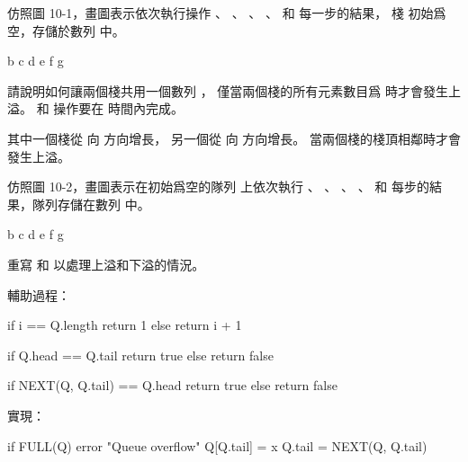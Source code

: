 \startsection[
  reference=section:stack_and_queue,
  title={Stacks and queues},
]

\startEXERCISE
仿照圖 10-1，畫圖表示依次執行操作 、 、 、
 、   和  每一步的結果，
棧  初始爲空，存儲於數列  中。
\stopEXERCISE

\startANSWER
{}
{\externalfigure[output/e10_1_1-2]}{b}
{\externalfigure[output/e10_1_1-3]}{c}
{\externalfigure[output/e10_1_1-4]}{d}
{\externalfigure[output/e10_1_1-5]}{e}
{\externalfigure[output/e10_1_1-6]}{f}
{\externalfigure[output/e10_1_1-7]}{g}
\stopcombination
\stopANSWER

\startEXERCISE
請說明如何讓兩個棧共用一個數列 ，
僅當兩個棧的所有元素數目爲  時才會發生上溢。
  和  操作要在  時間內完成。
\stopEXERCISE

\startANSWER
其中一個棧從  向  方向增長，
另一個從  向  方向增長。
當兩個棧的棧頂相鄰時才會發生上溢。
\stopANSWER

\startEXERCISE
仿照圖 10-2，畫圖表示在初始爲空的隊列  上依次執行 、
 、 、 、
  和  每步的結果，隊列存儲在數列  中。
\stopEXERCISE

\startANSWER
{}
{\externalfigure[output/e10_1_3-2]}{b}
{\externalfigure[output/e10_1_3-3]}{c}
{\externalfigure[output/e10_1_3-4]}{d}
{\externalfigure[output/e10_1_3-5]}{e}
{\externalfigure[output/e10_1_3-6]}{f}
{\externalfigure[output/e10_1_3-7]}{g}
{}{}{}{}
\stopcombination
\stopANSWER

\startEXERCISE
重寫  和  以處理上溢和下溢的情況。
\stopEXERCISE

\startANSWER
輔助過程：

\startCLRS
if i == Q.length
	return 1
else
	return i + 1
\stopCLRS

\startCLRS
if Q.head == Q.tail
	return true
else
	return false
\stopCLRS

\startCLRS
if NEXT(Q, Q.tail) == Q.head
	return true
else
	return false
\stopCLRS

實現：

\startCLRS
if FULL(Q)
	error "Queue overflow"
Q[Q.tail] = x
Q.tail = NEXT(Q, Q.tail)
\stopCLRS

